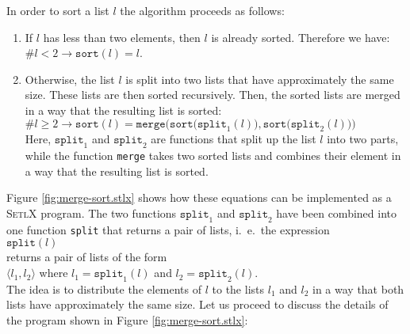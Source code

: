 In order to sort a list $l$ the algorithm proceeds as follows:
\begin{enumerate}
\item If $l$ has less than two elements, then $l$ is already sorted.  Therefore we have: 
      \\[0.2cm]
      \hspace*{1.3cm}
      $\#l < 2 \rightarrow \mathtt{sort}(l) = l$.
\item Otherwise, the list $l$ is split into two lists that have approximately the same size.
      These lists are then sorted recursively.  Then, the sorted lists are merged in a way that the
      resulting list is sorted: \\[0.2cm]
      \hspace*{1.3cm} 
      $\#l \geq 2 \rightarrow \mathtt{sort}(l) = \mathtt{merge}\bigl(\mathtt{sort}\bigl(\mathtt{split}_1(l)\bigr), \mathtt{sort}\bigl(\mathtt{split}_2(l)\bigr)\bigr)$
     \\[0.2cm]
     Here, $\texttt{split}_1$ and $\mathtt{split}_2$ are functions that split up the list $l$ into
     two parts, while the function \texttt{merge} takes two sorted lists and combines their element
     in a way that the resulting list is sorted.
\end{enumerate}
Figure \ref{fig:merge-sort.stlx} shows how these equations can be implemented as a \textsc{SetlX}
program.  The two functions $\mathtt{split}_1$ and $\mathtt{split}_2$ have been combined into one
function \texttt{split} that returns a pair of lists, i.~e.~the expression
\\[0.2cm]
\hspace*{1.3cm}
$\mathtt{split}(l)$
\\[0.2cm]
returns a pair of lists of the form
\\[0.2cm]
\hspace*{1.3cm}
$\langle l_1, l_2 \rangle$ \quad where $l_1 = \mathtt{split}_1(l)$ and $l_2 = \mathtt{split}_2(l)$.
\\[0.2cm]
The idea is to distribute the elements of $l$ to the lists $l_1$ and $l_2$ in a way that both lists
have approximately the same size.   Let us proceed to discuss the details of the program shown in
Figure \ref{fig:merge-sort.stlx}:


